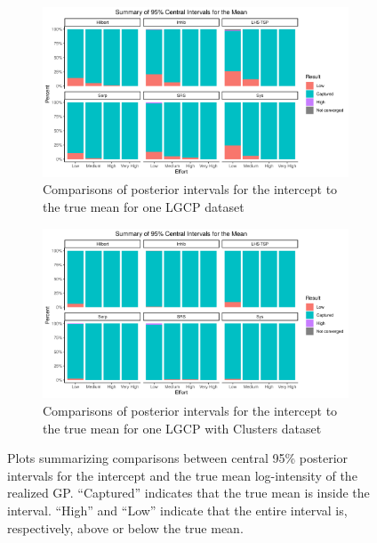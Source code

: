 \documentclass[review]{elsarticle}
\begin{document}
\begin{figure}

\begin{subfigure}{4.5in}
\includegraphics[width=4.5in]{../graphics/IntCapture-LGCP000004.png}
\caption{Comparisons of posterior intervals for the intercept to the true mean
for one LGCP dataset}
\label{intlgcp}
\end{subfigure}

\begin{subfigure}{4.5in}
\includegraphics[width=4.5in]{../graphics/IntCapture-Cluster000004.png}
\caption{Comparisons of posterior intervals for the intercept to the true mean
for one LGCP with Clusters dataset}
\label{intclust}
\end{subfigure}

\caption{Plots summarizing comparisons between central 95\% posterior intervals
for the intercept and the true mean log-intensity of the realized GP.
``Captured'' indicates that the true mean is inside the interval. ``High'' and
``Low'' indicate that the entire interval is, respectively, above or below the
true mean.}
\label{intresults}
\end{figure}
\end{document}
